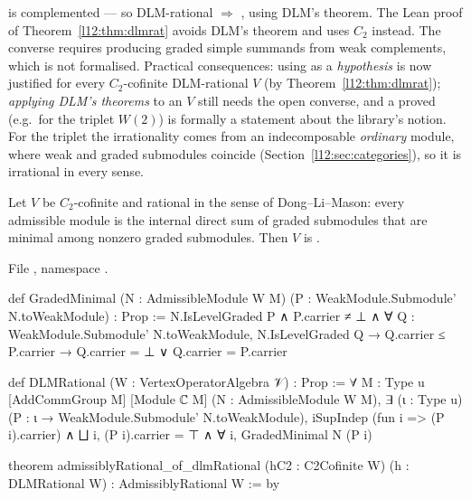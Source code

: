 \begin{warning}
is complemented --- so DLM-rational $\Rightarrow$ , using DLM's theorem. The Lean proof of
Theorem~\ref{l12:thm:dlmrat} avoids DLM's theorem and uses $C_2$ instead. The converse requires producing
graded simple summands from weak complements, which is not formalised. Practical consequences: using
 as a \emph{hypothesis} is now justified for every $C_2$-cofinite DLM-rational $V$ (by
Theorem~\ref{l12:thm:dlmrat}); \emph{applying DLM's theorems} to an  $V$ still needs the open
converse, and a proved  (e.g.\ for the triplet
$W(2)$) is formally a statement about the library's notion. For the triplet the irrationality comes from an
indecomposable \emph{ordinary} module, where weak and graded submodules coincide (Section~\ref{l12:sec:categories}), so
it is irrational in every sense.
\end{warning}

\begin{theorem}\label{l12:thm:dlmrat}
Let $V$ be $C_2$-cofinite and rational in the sense of Dong--Li--Mason: every admissible module is the internal direct sum
of graded submodules that are minimal among nonzero graded submodules. Then $V$ is .
\end{theorem}
\noindent File , namespace
.
\begin{leancode}
def GradedMinimal (N : AdmissibleModule W M) (P : WeakModule.Submodule' N.toWeakModule) : Prop :=
  N.IsLevelGraded P ∧ P.carrier ≠ ⊥ ∧
    ∀ Q : WeakModule.Submodule' N.toWeakModule, N.IsLevelGraded Q → Q.carrier ≤ P.carrier →
      Q.carrier = ⊥ ∨ Q.carrier = P.carrier

def DLMRational (W : VertexOperatorAlgebra 𝒱) : Prop :=
  ∀ {M : Type u} [AddCommGroup M] [Module ℂ M] (N : AdmissibleModule W M),
    ∃ (ι : Type u) (P : ι → WeakModule.Submodule' N.toWeakModule),
      iSupIndep (fun i => (P i).carrier) ∧ ⨆ i, (P i).carrier = ⊤ ∧ ∀ i, GradedMinimal N (P i)

theorem admissiblyRational_of_dlmRational (hC2 : C2Cofinite W) (h : DLMRational W) :
    AdmissiblyRational W := by
\end{leancode}

